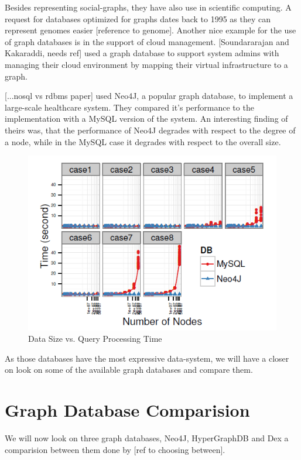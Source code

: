 \documentclass{acm_proc_article-sp}
\begin{document}
Besides representing social-graphs, they have also use in scientific computing. A request for databases optimized for graphs dates back to 1995 as they can represent genomes easier [reference to genome]. Another nice example for the use of graph databases is in the support of cloud management. [Soundararajan and Kakaraddi, needs ref] used a graph database to support system admins with managing their cloud environment by mapping their virtual infrastructure to a graph.

[...nosql vs rdbms paper] used Neo4J, a popular graph database, to implement a large-scale healthcare system. They compared it's performance to the implementation with a MySQL version of the system. An interesting finding of theirs was, that the performance of Neo4J degrades with respect to the degree of a node, while in the MySQL case it degrades with respect to the overall size.

\begin{figure}[hbtp]
	\centering
	\includegraphics[scale=0.5]{neo4j_mysql.png}
	\caption{Data Size vs. Query Processing Time}
\end{figure}

As those databases have the most expressive data-system, we will have a closer on look on some of the available graph databases and compare them.

\section{Graph Database Comparision}

We will now look on three graph databases, Neo4J, HyperGraphDB and Dex a comparision between them done by [ref to choosing between].
\end{document}
